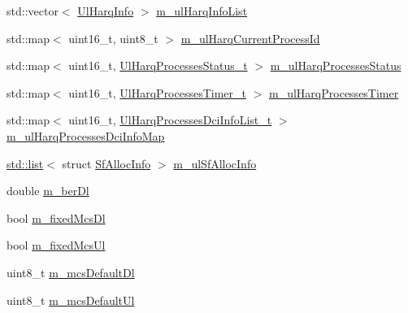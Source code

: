 \begin{DoxyCompactItemize}
std\+::vector$<$ \hyperlink{structns3_1_1UlHarqInfo}{Ul\+Harq\+Info} $>$ \hyperlink{classns3_1_1MmWaveFlexTtiMaxRateMacScheduler_a686a92955acbcdcde854c36eb9aaf82d}{m\+\_\+ul\+Harq\+Info\+List}
\item 
std\+::map$<$ uint16\+\_\+t, uint8\+\_\+t $>$ \hyperlink{classns3_1_1MmWaveFlexTtiMaxRateMacScheduler_a43404ca219c5970aa5d190db6520bc4b}{m\+\_\+ul\+Harq\+Current\+Process\+Id}
\item 
std\+::map$<$ uint16\+\_\+t, \hyperlink{classns3_1_1MmWaveFlexTtiMaxRateMacScheduler_a372b94d5ee1b47bb9005acc067ee9459}{Ul\+Harq\+Processes\+Status\+\_\+t} $>$ \hyperlink{classns3_1_1MmWaveFlexTtiMaxRateMacScheduler_a4c1a909f08f91a4c845df5310c35f9ff}{m\+\_\+ul\+Harq\+Processes\+Status}
\item 
std\+::map$<$ uint16\+\_\+t, \hyperlink{classns3_1_1MmWaveFlexTtiMaxRateMacScheduler_a5f21f8a4c82fd8a654655918894dd007}{Ul\+Harq\+Processes\+Timer\+\_\+t} $>$ \hyperlink{classns3_1_1MmWaveFlexTtiMaxRateMacScheduler_af949cb8c0c34fd1e7464931c7138193a}{m\+\_\+ul\+Harq\+Processes\+Timer}
\item 
std\+::map$<$ uint16\+\_\+t, \hyperlink{classns3_1_1MmWaveFlexTtiMaxRateMacScheduler_a4e95b2440884f66e129e34b9c2fad48f}{Ul\+Harq\+Processes\+Dci\+Info\+List\+\_\+t} $>$ \hyperlink{classns3_1_1MmWaveFlexTtiMaxRateMacScheduler_a5ae563578daa0d3ea769017d73218ec3}{m\+\_\+ul\+Harq\+Processes\+Dci\+Info\+Map}
\item 
\hyperlink{openflow-interface_8h_afd9bcfa176617760671b67580f536fa7}{std\+::list}$<$ struct \hyperlink{structns3_1_1SfAllocInfo}{Sf\+Alloc\+Info} $>$ \hyperlink{classns3_1_1MmWaveFlexTtiMaxRateMacScheduler_a6cc82116489d370311a341e727f231d3}{m\+\_\+ul\+Sf\+Alloc\+Info}
\item 
double \hyperlink{classns3_1_1MmWaveFlexTtiMaxRateMacScheduler_a6dabf2ab4d9a630332ecdb2e543301ca}{m\+\_\+ber\+Dl}
\item 
bool \hyperlink{classns3_1_1MmWaveFlexTtiMaxRateMacScheduler_abcbcedf1b2fef79d0e2d18e25f212880}{m\+\_\+fixed\+Mcs\+Dl}
\item 
bool \hyperlink{classns3_1_1MmWaveFlexTtiMaxRateMacScheduler_aa726b9bb7889308bfb3688db1bbc6923}{m\+\_\+fixed\+Mcs\+Ul}
\item 
uint8\+\_\+t \hyperlink{classns3_1_1MmWaveFlexTtiMaxRateMacScheduler_a10a1c4d21a0a78ebdc57339baf1c4142}{m\+\_\+mcs\+Default\+Dl}
\item 
uint8\+\_\+t \hyperlink{classns3_1_1MmWaveFlexTtiMaxRateMacScheduler_a2c3b6f1fd3e3105407557c1179a0e2e3}{m\+\_\+mcs\+Default\+Ul}
\item 

\end{DoxyCompactItemize}
